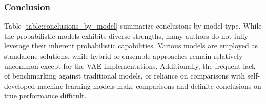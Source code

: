 \subsubsection{Conclusion} %
Table \ref{table:conclusions_by_model} summarize conclusions by model type. While the probabilistic models exhibits diverse strengths, many authors do not fully leverage their inherent probabilistic capabilities. Various models are employed as standalone solutions, while hybrid or ensemble approaches remain relatively uncommon except for the VAE implementations. Additionally, the frequent lack of benchmarking against traditional models, or reliance on comparisons with self-developed machine learning models make comparisons and definite conclusions on true performance difficult. 

